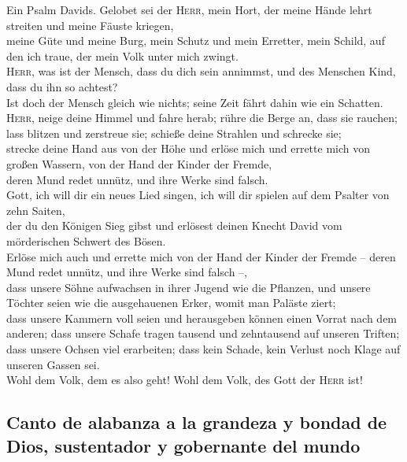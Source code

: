  Ein Psalm Davids. Gelobet sei der \textsc{Herr}, mein
Hort, der meine Hände lehrt streiten und meine Fäuste kriegen,\\
 meine Güte und meine Burg, mein Schutz und mein Erretter,
mein Schild, auf den ich traue, der mein Volk unter mich zwingt.\\
 \textsc{Herr}, was ist der Mensch, dass du dich sein
annimmst, und des Menschen Kind, dass du ihn so achtest?\\
 Ist doch der Mensch gleich wie nichts; seine Zeit fährt
dahin wie ein Schatten.\\
 \textsc{Herr}, neige deine Himmel und fahre herab; rühre
die Berge an, dass sie rauchen;\\
 lass blitzen und zerstreue sie; schieße deine Strahlen
und schrecke sie;\\
 strecke deine Hand aus von der Höhe und erlöse mich und
errette mich von großen Wassern, von der Hand der Kinder der Fremde,\\
 deren Mund redet unnütz, und ihre Werke sind falsch.\\
 Gott, ich will dir ein neues Lied singen, ich will dir
spielen auf dem Psalter von zehn Saiten,\\
 der du den Königen Sieg gibst und erlösest deinen Knecht
David vom mörderischen Schwert des Bösen.\\
 Erlöse mich auch und errette mich von der Hand der
Kinder der Fremde -- deren Mund redet unnütz, und ihre Werke sind falsch
--,\\
 dass unsere Söhne aufwachsen in ihrer Jugend wie die
Pflanzen, und unsere Töchter seien wie die ausgehauenen Erker, womit man
Paläste ziert;\\
 dass unsere Kammern voll seien und herausgeben können
einen Vorrat nach dem anderen; dass unsere Schafe tragen tausend und
zehntausend auf unseren Triften;\\
 dass unsere Ochsen viel erarbeiten; dass kein Schade,
kein Verlust noch Klage auf unseren Gassen sei.\\
 Wohl dem Volk, dem es also geht! Wohl dem Volk, des Gott
der \textsc{Herr} ist!

\hypertarget{canto-de-alabanza-a-la-grandeza-y-bondad-de-dios-sustentador-y-gobernante-del-mundo}{%
\subsection{Canto de alabanza a la grandeza y bondad de Dios,
sustentador y gobernante del
mundo}\label{canto-de-alabanza-a-la-grandeza-y-bondad-de-dios-sustentador-y-gobernante-del-mundo}}

